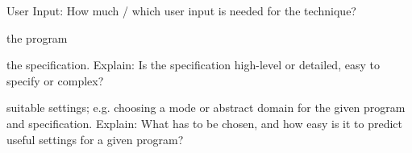 \documentclass[a4paper]{article}
\begin{document}
\begin{landscape}
\begin{minipage}[t]{0.2\linewidth}
\begin{betterlist}
\begin{betterlist}
		\end{betterlist}
		\item \alert{User Input:} How much / which user input is needed for the technique?
		\begin{betterlist}
			\item \checkboxChecked the program
			\item \checkboxHalfChecked the specification. Explain: Is the specification high-level or detailed, easy to specify or complex?

			\item \checkboxChecked suitable settings; e.g. choosing a mode or abstract domain for the given program and specification. Explain: What has to be chosen, and how easy is it to predict useful settings for a given program?


\end{betterlist}
\end{betterlist}
\end{minipage}
\end{landscape}
\end{document}
